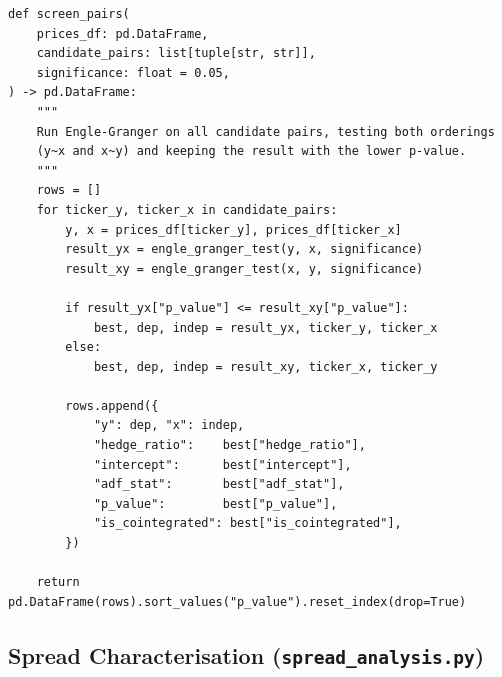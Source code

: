 \documentclass[a4paper]{report}
\begin{document}
\begin{Verbatim}[fontsize=\footnotesize, baselinestretch=0.85]
def screen_pairs(
    prices_df: pd.DataFrame,
    candidate_pairs: list[tuple[str, str]],
    significance: float = 0.05,
) -> pd.DataFrame:
    """
    Run Engle-Granger on all candidate pairs, testing both orderings
    (y~x and x~y) and keeping the result with the lower p-value.
    """
    rows = []
    for ticker_y, ticker_x in candidate_pairs:
        y, x = prices_df[ticker_y], prices_df[ticker_x]
        result_yx = engle_granger_test(y, x, significance)
        result_xy = engle_granger_test(x, y, significance)

        if result_yx["p_value"] <= result_xy["p_value"]:
            best, dep, indep = result_yx, ticker_y, ticker_x
        else:
            best, dep, indep = result_xy, ticker_x, ticker_y

        rows.append({
            "y": dep, "x": indep,
            "hedge_ratio":    best["hedge_ratio"],
            "intercept":      best["intercept"],
            "adf_stat":       best["adf_stat"],
            "p_value":        best["p_value"],
            "is_cointegrated": best["is_cointegrated"],
        })

    return pd.DataFrame(rows).sort_values("p_value").reset_index(drop=True)
\end{Verbatim}

\subsection{Spread Characterisation (\texttt{spread\_analysis.py})}
\end{document}
